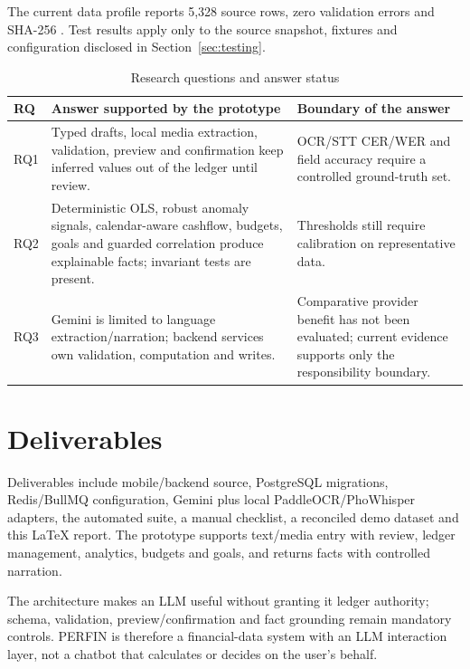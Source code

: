 The current data profile reports 5,328 source rows, zero validation errors and SHA-256 . Test results apply only to the source snapshot, fixtures and configuration disclosed in Section~\ref{sec:testing}.

\begin{table}[H]
  \centering
  \caption{Research questions and answer status}
  \label{tab:research-questions}
  \begin{tabularx}{\textwidth}{@{}L{1.2cm}Y Y@{}}
    \toprule
    \textbf{RQ} & \textbf{Answer supported by the prototype} & \textbf{Boundary of the answer} \\
    \midrule
    RQ1 & Typed drafts, local media extraction, validation, preview and confirmation keep inferred values out of the ledger until review. & OCR/STT CER/WER and field accuracy require a controlled ground-truth set. \\
    RQ2 & Deterministic OLS, robust anomaly signals, calendar-aware cashflow, budgets, goals and guarded correlation produce explainable facts; invariant tests are present. & Thresholds still require calibration on representative data. \\
    RQ3 & Gemini is limited to language extraction/narration; backend services own validation, computation and writes. & Comparative provider benefit has not been evaluated; current evidence supports only the responsibility boundary. \\
    \bottomrule
  \end{tabularx}
\end{table}

\section{Deliverables}

Deliverables include mobile/backend source, PostgreSQL migrations, Redis/BullMQ configuration, Gemini plus local PaddleOCR/PhoWhisper adapters, the automated suite, a manual checklist, a reconciled demo dataset and this LaTeX report. The prototype supports text/media entry with review, ledger management, analytics, budgets and goals, and returns facts with controlled narration.

The architecture makes an LLM useful without granting it ledger authority; schema, validation, preview/confirmation and fact grounding remain mandatory controls. PERFIN is therefore a financial-data system with an LLM interaction layer, not a chatbot that calculates or decides on the user's behalf.

